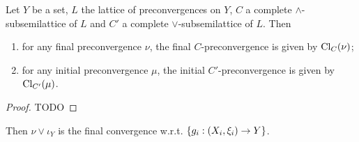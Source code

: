\begin{proposition}
Let $Y$ be a set, $L$ the lattice of preconvergences on $Y$, $C$ a complete $\wedge$-subsemilattice of $L$ and $C'$ a complete $\vee$-subsemilattice of $L$. Then
\begin{enumerate}
\item for any final preconvergence $\nu$, the final $C$-preconvergence is given by $\operatorname{Cl}_C(\nu)$;
\item for any initial preconvergence $\mu$, the initial $C'$-preconvergence is given by $\operatorname{Cl}_{C'}(\mu)$.
\end{enumerate}
\end{proposition}
\begin{proof}
TODO
\end{proof}

Then $\nu \vee \iota_Y$ is the final convergence w.r.t. $\{g_i: \left( X_i, \xi_i \right) \to Y\}$.


